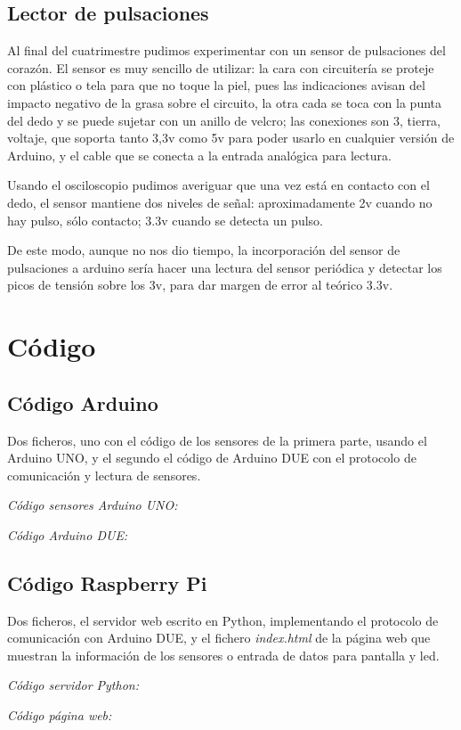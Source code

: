 \documentclass[]{article}
\begin{document}

\subsection{Lector de pulsaciones}
Al final del cuatrimestre pudimos experimentar con un sensor de pulsaciones del corazón. El sensor es muy sencillo de utilizar: la cara con circuitería se proteje con plástico o tela para que no toque la piel, pues las indicaciones avisan del impacto negativo de la grasa sobre el circuito, la otra cada se toca con la punta del dedo y se puede sujetar con un anillo de velcro; las conexiones son 3, tierra, voltaje, que soporta tanto 3,3v como 5v para poder usarlo en cualquier versión de Arduino, y el cable que se conecta a la entrada analógica para lectura.

Usando el osciloscopio pudimos averiguar que una vez está en contacto con el dedo, el sensor mantiene dos niveles de señal: aproximadamente 2v cuando no hay pulso, sólo contacto; 3.3v cuando se detecta un pulso.

De este modo, aunque no nos dio tiempo, la incorporación del sensor de pulsaciones a arduino sería hacer una lectura del sensor periódica y detectar los picos de tensión sobre los 3v, para dar margen de error al teórico 3.3v.

\section{Código}
\subsection{Código Arduino}

Dos ficheros, uno con el código de los sensores de la primera parte, usando el Arduino UNO, y el segundo el código de Arduino DUE con el protocolo de comunicación y lectura de sensores.


\textit{Código sensores Arduino UNO:}


\textit{Código Arduino DUE:}


\subsection{Código Raspberry Pi}

Dos ficheros, el servidor web escrito en Python, implementando el protocolo de comunicación con Arduino DUE, y el fichero \textit{index.html} de la página web que muestran la información de los sensores o entrada de datos para pantalla y led.

\textit{Código servidor Python:}


\textit{Código página web:}

\end{document}
